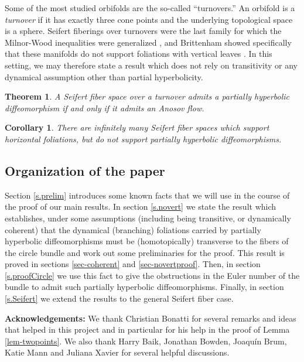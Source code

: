 \documentclass[11pt]{amsart} %
\numberwithin{equation}{section}
\newtheorem{thm}[equation]{Theorem}
\newtheorem{cor}[equation]{Corollary}
\theoremstyle{remark}
\begin{document}
Some of the most studied
orbifolds are the so-called ``turnovers.''
An orbifold is a \emph{turnover}
if it has exactly three cone points and
the underlying topological space is a sphere.
Seifert fiberings over turnovers were the last family for which the
Milnor-Wood inequalities were generalized \cite{nai1994foliations},
and Brittenham showed specifically
that these manifolds do not support foliations with vertical leaves
\cite{Brittenham}.
In this setting, we may therefore state a result which does not rely on
transitivity or any dynamical assumption other than partial hyperbolicity.

\begin{thm} \label{thm:turnover}
    A Seifert fiber space over a turnover
    admits a partially hyperbolic diffeomorphism
    if and only if it admits an Anosov flow.
\end{thm}
\begin{cor} \label{cor:turnex}
    There are infinitely many Seifert fiber spaces which
    support horizontal foliations,
    but do not support partially hyperbolic diffeomorphisms.
\end{cor}

%


%


\subsection{Organization of the paper} Section \ref{s.prelim} introduces some known facts that we will use in the course of the proof of our main results. In section \ref{s.novert} we state the result which establishes, under some assumptions (including being transitive, or dynamically coherent) that the dynamical (branching) foliations carried by partially hyperbolic diffeomorphisms must be (homotopically) transverse to the fibers of the circle bundle and work out some preliminaries for the proof.  This result is proved in sections \ref{sec-coherent} and \ref{sec-novertproof}. Then, in section \ref{s.proofCircle} we use this fact to give the obstructions in the Euler number of the bundle to admit such partially hyperbolic diffeomorphisms. Finally, in section \ref{s.Seifert} we extend the results to the general Seifert fiber case. 

\medskip 
{\bf Acknowledgements:} We thank Christian Bonatti for several remarks and ideas that helped in this project and in particular for his help in the proof of Lemma \ref{lem-twopoints}. We also thank Harry Baik, Jonathan Bowden, Joaqu\'in Brum, Katie Mann and Juliana Xavier for several helpful discussions.
\end{document}
